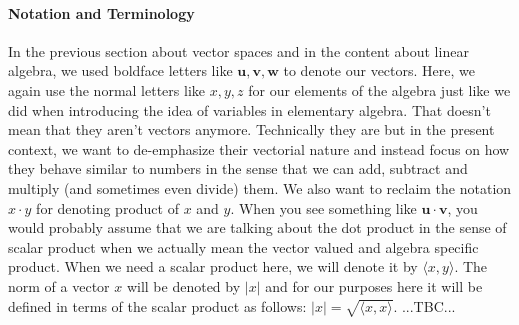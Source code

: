 





\paragraph{Notation and Terminology}
In the previous section about vector spaces and in the content about linear algebra, we used boldface letters like $\mathbf{u,v,w}$ to denote our vectors. Here, we again use the normal letters like $x,y,z$ for our elements of the algebra just like we did when introducing the idea of variables in elementary algebra. That doesn't mean that they aren't vectors anymore. Technically they are but in the present context, we want to de-emphasize their vectorial nature and instead focus on how they behave similar to numbers in the sense that we can add, subtract and multiply (and sometimes even divide) them. We also want to reclaim the notation $x \cdot y$ for denoting product of $x$ and $y$. When you see something like $\mathbf{u} \cdot \mathbf{v}$, you would probably assume that we are talking about the dot product in the sense of scalar product when we actually mean the vector valued and algebra specific product. When we need a scalar product here, we will denote it by $\langle x, y \rangle$. The norm of a vector $x$ will be denoted by $|x|$ and for our purposes here it will be defined in terms of the scalar product as follows: $|x| = \sqrt{ \langle x, x \rangle }$.  ...TBC...




